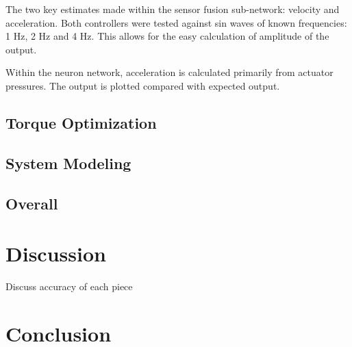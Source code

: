 \documentclass[letterpaper, 10 pt, conference]{IEEEconf} %
\newcommand{\bbs}[1]{\section{#1}}
\newcommand{\bbss}[1]{\subsection{#1}}
\begin{document}
The two key estimates made within the sensor fusion sub-network: velocity and
acceleration. Both controllers were tested against sin waves of known
frequencies: 1 Hz, 2 Hz and 4 Hz. This allows for the easy calculation of
amplitude of the output.


Within the neuron network, acceleration is calculated primarily from actuator
pressures. The output is plotted compared with expected output.


\bbss{Torque Optimization}


\bbss{System Modeling}


\bbss{Overall}


\bbs{Discussion}
\label{chap:discussion}

Discuss accuracy of each piece

\bbs{Conclusion}
\label{chap:conclusion}

\newpage
\label{chap:references}
\printbibliography[heading=bibintoc, title={Bibliography}]
\end{document}
